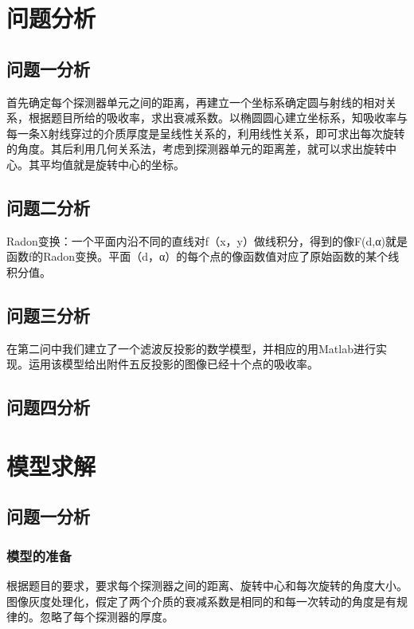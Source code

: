 \documentclass[withoutpreface,bwprint]{cumcmthesis} %
\begin{document}
\section{问题分析}

\subsection{问题一分析}

首先确定每个探测器单元之间的距离，再建立一个坐标系确定圆与射线的相对关系，根据题目所给的吸收率，求出衰减系数。以椭圆圆心建立坐标系，知吸收率与每一条X射线穿过的介质厚度是呈线性关系的，利用线性关系，即可求出每次旋转的角度。其后利用几何关系法，考虑到探测器单元的距离差，就可以求出旋转中心。其平均值就是旋转中心的坐标。
\subsection{问题二分析}
Radon变换：一个平面内沿不同的直线对f（x，y）做线积分，得到的像F(d,α)就是函数f的Radon变换。平面（d，α）的每个点的像函数值对应了原始函数的某个线积分值。
\subsection{问题三分析}
在第二问中我们建立了一个滤波反投影的数学模型，并相应的用Matlab进行实现。运用该模型给出附件五反投影的图像已经十个点的吸收率。

\subsection{问题四分析}

\section{模型求解}
\subsection{问题一分析}
\subsubsection{模型的准备}
根据题目的要求，要求每个探测器之间的距离、旋转中心和每次旋转的角度大小。图像灰度处理化，假定了两个介质的衰减系数是相同的和每一次转动的角度是有规律的。忽略了每个探测器的厚度。
\end{document}
